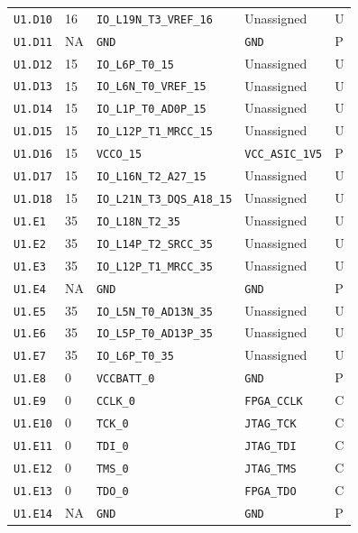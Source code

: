 \documentclass[11pt,a4paper]{article}
\begin{document}
\begin{longtable}{@{}P{20mm}P{10mm}P{70mm}P{51mm}P{11mm}@{}}
\nolinkurl{U1.D10} & 16 & \nolinkurl{IO_L19N_T3_VREF_16} & Unassigned & U \\
\nolinkurl{U1.D11} & NA & \nolinkurl{GND} & \nolinkurl{GND} & P \\
\nolinkurl{U1.D12} & 15 & \nolinkurl{IO_L6P_T0_15} & Unassigned & U \\
\nolinkurl{U1.D13} & 15 & \nolinkurl{IO_L6N_T0_VREF_15} & Unassigned & U \\
\nolinkurl{U1.D14} & 15 & \nolinkurl{IO_L1P_T0_AD0P_15} & Unassigned & U \\
\nolinkurl{U1.D15} & 15 & \nolinkurl{IO_L12P_T1_MRCC_15} & Unassigned & U \\
\nolinkurl{U1.D16} & 15 & \nolinkurl{VCCO_15} & \nolinkurl{VCC_ASIC_1V5} & P \\
\nolinkurl{U1.D17} & 15 & \nolinkurl{IO_L16N_T2_A27_15} & Unassigned & U \\
\nolinkurl{U1.D18} & 15 & \nolinkurl{IO_L21N_T3_DQS_A18_15} & Unassigned & U \\
\nolinkurl{U1.E1} & 35 & \nolinkurl{IO_L18N_T2_35} & Unassigned & U \\
\nolinkurl{U1.E2} & 35 & \nolinkurl{IO_L14P_T2_SRCC_35} & Unassigned & U \\
\nolinkurl{U1.E3} & 35 & \nolinkurl{IO_L12P_T1_MRCC_35} & Unassigned & U \\
\nolinkurl{U1.E4} & NA & \nolinkurl{GND} & \nolinkurl{GND} & P \\
\nolinkurl{U1.E5} & 35 & \nolinkurl{IO_L5N_T0_AD13N_35} & Unassigned & U \\
\nolinkurl{U1.E6} & 35 & \nolinkurl{IO_L5P_T0_AD13P_35} & Unassigned & U \\
\nolinkurl{U1.E7} & 35 & \nolinkurl{IO_L6P_T0_35} & Unassigned & U \\
\nolinkurl{U1.E8} & 0 & \nolinkurl{VCCBATT_0} & \nolinkurl{GND} & P \\
\nolinkurl{U1.E9} & 0 & \nolinkurl{CCLK_0} & \nolinkurl{FPGA_CCLK} & C \\
\nolinkurl{U1.E10} & 0 & \nolinkurl{TCK_0} & \nolinkurl{JTAG_TCK} & C \\
\nolinkurl{U1.E11} & 0 & \nolinkurl{TDI_0} & \nolinkurl{JTAG_TDI} & C \\
\nolinkurl{U1.E12} & 0 & \nolinkurl{TMS_0} & \nolinkurl{JTAG_TMS} & C \\
\nolinkurl{U1.E13} & 0 & \nolinkurl{TDO_0} & \nolinkurl{FPGA_TDO} & C \\
\nolinkurl{U1.E14} & NA & \nolinkurl{GND} & \nolinkurl{GND} & P \\

\end{longtable}
\end{document}
